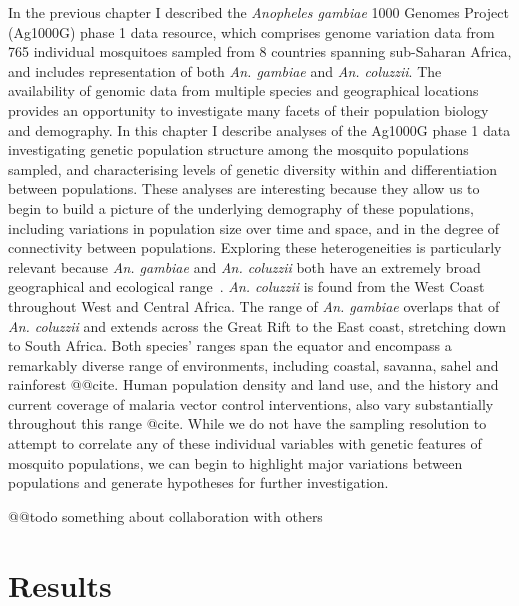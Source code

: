 \documentclass[a4paper,11pt,abstracton,hidelinks]{scrartcl}
\begin{document}
%
In the previous chapter I described the \textit{Anopheles gambiae} 1000 Genomes Project (Ag1000G) phase 1 data resource, which comprises genome variation data from 765 individual mosquitoes sampled from 8 countries spanning sub-Saharan Africa, and includes representation of both \textit{An. gambiae} and \textit{An. coluzzii}.
%
The availability of genomic data from multiple species and geographical locations provides an opportunity to investigate many facets of their population biology and demography.
%
In this chapter I describe analyses of the Ag1000G phase 1 data investigating genetic population structure among the mosquito populations sampled, and characterising levels of genetic diversity within and differentiation between populations.
%
These analyses are interesting because they allow us to begin to build a picture of the underlying demography of these populations, including variations in population size over time and space, and in the degree of connectivity between populations.
%
Exploring these heterogeneities is particularly relevant because \textit{An. gambiae} and \textit{An. coluzzii} both have an extremely broad geographical and ecological range~\citep{Wiebe2017}.
%
\textit{An. coluzzii} is found from the West Coast throughout West and Central Africa.
%
The range of \textit{An. gambiae} overlaps that of \textit{An. coluzzii} and extends across the Great Rift to the East coast, stretching down to South Africa.
%
Both species' ranges span the equator and encompass a remarkably diverse range of environments, including coastal, savanna, sahel and rainforest @@cite.
%
Human population density and land use, and the history and current coverage of malaria vector control interventions, also vary substantially throughout this range @cite.
%
While we do not have the sampling resolution to attempt to correlate any of these individual variables with genetic features of mosquito populations, we can begin to highlight major variations between populations and generate hypotheses for further investigation.
%


@@todo something about collaboration with others


\section{Results}\label{sec:results}
\end{document}
